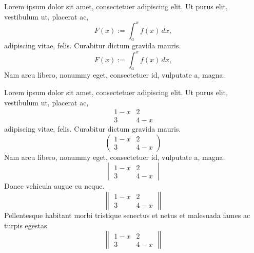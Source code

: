 \documentclass[a4paper,12pt]{article}
\begin{document}

Lorem ipsum dolor sit amet, consectetuer adipiscing elit. Ut purus elit, vestibulum ut, placerat ac, 
\begin{equation}
	F(x):= \int_a^x f(x)\,dx,
\end{equation}
adipiscing vitae, felis. Curabitur dictum gravida mauris.
\begin{equation*}
	F(x):= \int_a^x f(x)\,dx,
\end{equation*}
Nam arcu libero, nonummy eget, consectetuer id, vulputate a, magna.


 
 Lorem ipsum dolor sit amet, consectetuer adipiscing elit. Ut purus elit, vestibulum ut, placerat ac, 
 \begin{displaymath}
 	\begin{matrix}
 		1-x & 2 \\
 		3 & 4-x 
 	\end{matrix}
 \end{displaymath}
 adipiscing vitae, felis. Curabitur dictum gravida mauris.
 \begin{displaymath}
 	\begin{pmatrix}
 		1-x & 2 \\
 		3 & 4-x 
 	\end{pmatrix}
 \end{displaymath}
 Nam arcu libero, nonummy eget, consectetuer id, vulputate a, magna.
 \begin{displaymath}
 	\begin{vmatrix}
 		1-x & 2 \\
 		3 & 4-x 
 	\end{vmatrix}
 \end{displaymath}
 Donec vehicula augue eu neque.
 \begin{displaymath}
 	\begin{Vmatrix}
 		1-x & 2 \\
 		3 & 4-x 
 	\end{Vmatrix}
 \end{displaymath}
 Pellentesque habitant morbi tristique senectus et netus et malesuada fames ac turpis egestas.
 \begin{equation}
 	\begin{Vmatrix}
 		1-x & 2 \\
 		3 & 4-x 
 	\end{Vmatrix}
 \end{equation}
\end{document}
